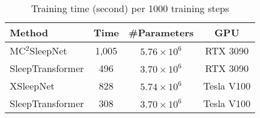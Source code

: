 \begin{table}[h]
\centering
\caption{Training time (second) per 1000 training steps}
\label{table4}
\begin{tabular}{lccc}
\hline
\textbf{Method} & \textbf{Time} & \textbf{\#Parameters}  & \textbf{GPU} \\
\hline
MC$^2$SleepNet & 1,005 & $5.76 \times 10^6$  & RTX 3090 \\
SleepTransformer & 496 & $3.70 \times 10^6$ & RTX 3090 \\
XSleepNet & 828 & $5.74 \times 10^6$ & Tesla V100 \\
SleepTransformer & 308 & $3.70 \times 10^6$ & Tesla V100  \\
\hline
\end{tabular}
\end{table}
